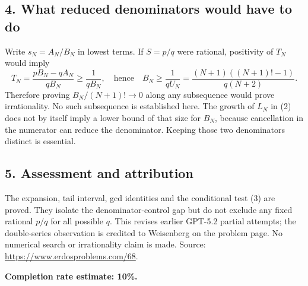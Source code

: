 \subsection*{4. What reduced denominators would have to do}
Write $s_N=A_N/B_N$ in lowest terms. If $S=p/q$ were rational, positivity of $T_N$ would imply
\[
 T_N=\frac{pB_N-qA_N}{qB_N}\ge\frac1{qB_N},
 \quad\text{hence}\quad
 B_N\ge\frac1{qU_N}
 =\frac{(N+1)((N+1)!-1)}{q(N+2)}. \tag{3}
\]
Therefore proving $B_N/(N+1)!\to0$ along any subsequence would prove irrationality. No such subsequence is established here. The growth of $L_N$ in (2) does not by itself imply a lower bound of that size for $B_N$, because cancellation in the numerator can reduce the denominator. Keeping those two denominators distinct is essential.

\subsection*{5. Assessment and attribution}
The expansion, tail interval, gcd identities and the conditional test (3) are proved. They isolate the denominator-control gap but do not exclude any fixed rational $p/q$ for all possible $q$. This revises earlier GPT-5.2 partial attempts; the double-series observation is credited to Weisenberg on the problem page. No numerical search or irrationality claim is made.
Source: \url{https://www.erdosproblems.com/68}.

\textbf{Completion rate estimate: 10\%.}
